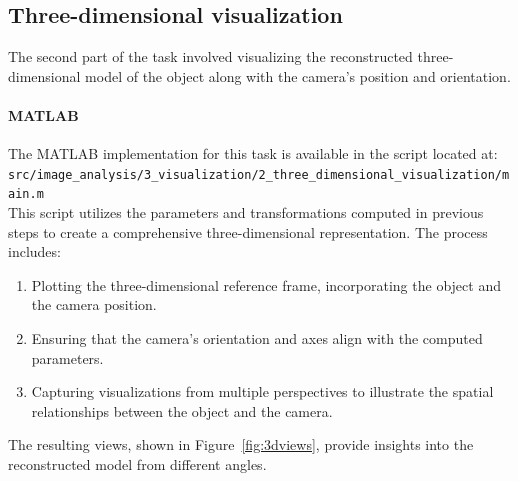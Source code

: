 \documentclass{Academic}
\begin{document}
\subsection{Three-dimensional visualization}
The second part of the task involved visualizing the reconstructed three-dimensional model of the object along with the camera’s position and orientation.

\paragraph*{MATLAB}
The MATLAB implementation for this task is available in the script located at: \\ 
\texttt{src/image\_analysis/3\_visualization/2\_three\_dimensional\_visualization/main.m} \\
This script utilizes the parameters and transformations computed in previous steps to create a comprehensive three-dimensional representation. 
The process includes:
\begin{enumerate}
    \item Plotting the three-dimensional reference frame, incorporating the object and the camera position.
    \item Ensuring that the camera’s orientation and axes align with the computed parameters.
    \item Capturing visualizations from multiple perspectives to illustrate the spatial relationships between the object and the camera.
\end{enumerate}
The resulting views, shown in Figure~\ref{fig:3dviews}, provide insights into the reconstructed model from different angles.
\end{document}
